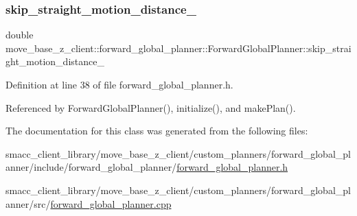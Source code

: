 \subsubsection{\texorpdfstring{skip\+\_\+straight\+\_\+motion\+\_\+distance\+\_\+}{skip\_straight\_motion\_distance\_}}
{\footnotesize\ttfamily double move\+\_\+base\+\_\+z\+\_\+client\+::forward\+\_\+global\+\_\+planner\+::\+Forward\+Global\+Planner\+::skip\+\_\+straight\+\_\+motion\+\_\+distance\+\_\+\hspace{0.3cm}{\ttfamily [private]}}



Definition at line 38 of file forward\+\_\+global\+\_\+planner.\+h.



Referenced by Forward\+Global\+Planner(), initialize(), and make\+Plan().



The documentation for this class was generated from the following files\+:\begin{DoxyCompactItemize}
\item 
smacc\+\_\+client\+\_\+library/move\+\_\+base\+\_\+z\+\_\+client/custom\+\_\+planners/forward\+\_\+global\+\_\+planner/include/forward\+\_\+global\+\_\+planner/\hyperlink{forward__global__planner_8h}{forward\+\_\+global\+\_\+planner.\+h}\item 
smacc\+\_\+client\+\_\+library/move\+\_\+base\+\_\+z\+\_\+client/custom\+\_\+planners/forward\+\_\+global\+\_\+planner/src/\hyperlink{forward__global__planner_8cpp}{forward\+\_\+global\+\_\+planner.\+cpp}\end{DoxyCompactItemize}

